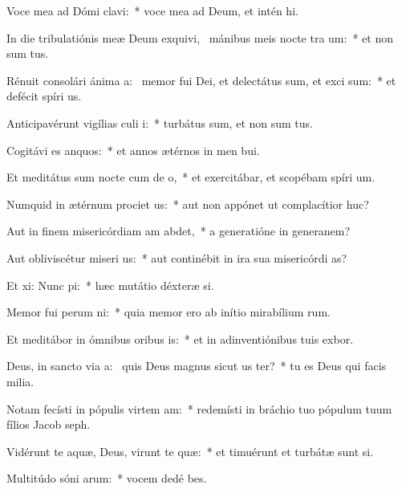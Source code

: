 \item Voce mea ad Dómi clavi:~* voce mea ad Deum, et intén hi.
\item In die tribulatiónis meæ Deum exquivi,~\pscross{} mánibus meis nocte tra um:~* et non sum tus.
\item Rénuit consolári ánima a:~\pscross{} memor fui Dei, et delectátus sum, et exci sum:~* et defécit spíri us.
\item Anticipavérunt vigílias culi i:~* turbátus sum, et non sum tus.
\item Cogitávi es anquos:~* et annos ætérnos in men bui.
\item Et meditátus sum nocte cum de o,~* et exercitábar, et scopébam spíri um.
\item Numquid in ætérnum prociet us:~* aut non appónet ut complacítior  huc?
\item Aut in finem misericórdiam am abdet,~* a generatióne in generanem?
\item Aut obliviscétur miseri us:~* aut continébit in ira sua misericórdi as?
\item Et xi: Nunc pi:~* hæc mutátio déxteræ si.
\item Memor fui perum ni:~* quia memor ero ab inítio mirabílium rum.
\item Et meditábor in ómnibus oribus is:~* et in adinventiónibus tuis exbor.
\item Deus, in sancto via a:~\pscross{} quis Deus magnus sicut us ter?~* tu es Deus qui facis milia.
\item Notam fecísti in pópulis virtem am:~* redemísti in bráchio tuo pópulum tuum fílios Jacob  seph.
\item Vidérunt te aquæ, Deus, virunt te quæ:~* et timuérunt et turbátæ sunt si.
\item Multitúdo sóni arum:~* vocem dedé bes.
